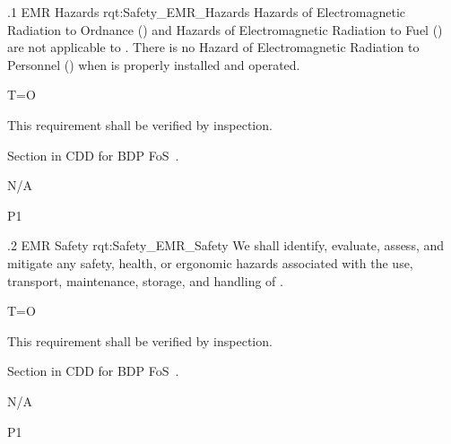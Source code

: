 \ONERQMTV
{\RqtNumberBase.1}
{EMR Hazards}
{rqt:Safety_EMR_Hazards}
{Hazards of Electromagnetic Radiation to Ordnance (\HERO) and Hazards of Electromagnetic Radiation to Fuel (\HERF) are not applicable to \ThisSys. There is no Hazard of Electromagnetic Radiation to Personnel (\HERP) when \ThisSys is properly installed and operated.}
{
	\item T=O
}
{This requirement shall be verified by inspection.}
{
\item [8.2] Section in CDD for BDP FoS~\cite{ref__BDP_FOS_CDD}.
}
{
	\item N/A
}
{P1}

\ONERQMTV
{\RqtNumberBase.2}
{EMR Safety}
{rqt:Safety_EMR_Safety}
{We shall identify, evaluate, assess, and mitigate any safety, health, or ergonomic hazards associated with the use, transport, maintenance, storage, and handling of \ThisSys.}
{
	\item T=O
}
{This requirement shall be verified by inspection.}
{
\item [8.2] Section in CDD for BDP FoS~\cite{ref__BDP_FOS_CDD}.
}
{
	\item N/A
}
{P1}

